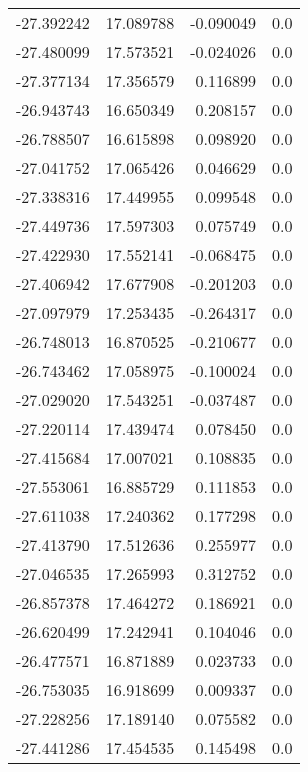 \begin{tabular}{rrrr}
      -27.392242 &        17.089788 &   -0.090049 &   0.0 \\
      -27.480099 &        17.573521 &   -0.024026 &   0.0 \\
      -27.377134 &        17.356579 &    0.116899 &   0.0 \\
      -26.943743 &        16.650349 &    0.208157 &   0.0 \\
      -26.788507 &        16.615898 &    0.098920 &   0.0 \\
      -27.041752 &        17.065426 &    0.046629 &   0.0 \\
      -27.338316 &        17.449955 &    0.099548 &   0.0 \\
      -27.449736 &        17.597303 &    0.075749 &   0.0 \\
      -27.422930 &        17.552141 &   -0.068475 &   0.0 \\
      -27.406942 &        17.677908 &   -0.201203 &   0.0 \\
      -27.097979 &        17.253435 &   -0.264317 &   0.0 \\
      -26.748013 &        16.870525 &   -0.210677 &   0.0 \\
      -26.743462 &        17.058975 &   -0.100024 &   0.0 \\
      -27.029020 &        17.543251 &   -0.037487 &   0.0 \\
      -27.220114 &        17.439474 &    0.078450 &   0.0 \\
      -27.415684 &        17.007021 &    0.108835 &   0.0 \\
      -27.553061 &        16.885729 &    0.111853 &   0.0 \\
      -27.611038 &        17.240362 &    0.177298 &   0.0 \\
      -27.413790 &        17.512636 &    0.255977 &   0.0 \\
      -27.046535 &        17.265993 &    0.312752 &   0.0 \\
      -26.857378 &        17.464272 &    0.186921 &   0.0 \\
      -26.620499 &        17.242941 &    0.104046 &   0.0 \\
      -26.477571 &        16.871889 &    0.023733 &   0.0 \\
      -26.753035 &        16.918699 &    0.009337 &   0.0 \\
      -27.228256 &        17.189140 &    0.075582 &   0.0 \\
      -27.441286 &        17.454535 &    0.145498 &   0.0 \\

\end{tabular}
